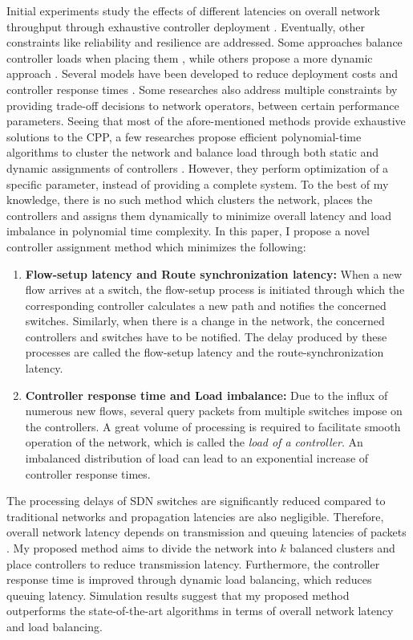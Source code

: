 \documentclass[preprint,12pt]{elsarticle}
\begin{document}
	Initial experiments study the effects of different latencies on overall network throughput through exhaustive controller deployment \cite{cpp2012heller}. Eventually, other constraints like reliability \cite{hu2013reliability} and resilience \cite{zhang2011resilience} are addressed. Some approaches balance controller loads when placing them \cite{yao2014capacitated}, while others propose a more dynamic approach \cite{yao2015controller}. Several models have been developed to reduce deployment costs \cite{sallahi2015optimal} and controller response times \cite{wang2016dynamic}. Some researches also address multiple constraints by providing trade-off decisions to network operators, between certain performance parameters. Seeing that most of the afore-mentioned methods provide exhaustive solutions to the CPP, a few researches propose efficient polynomial-time algorithms to cluster the network \cite{dbcp2017} and balance load through both static \cite{dbcp2017} and dynamic assignments of controllers \cite{filali2018sdn}. However, they perform optimization of a specific parameter, instead of providing a complete system. To the best of my knowledge, there is no such method which clusters the network, places the controllers and assigns them dynamically to minimize overall latency and load imbalance in polynomial time complexity. In this paper, I propose a novel controller assignment method which minimizes the following:
	\begin{enumerate}
		\item \textbf{Flow-setup latency and Route synchronization latency:} When a new flow arrives at a switch, the flow-setup process is initiated through which the corresponding controller calculates a new path and notifies the concerned switches. Similarly, when there is a change in the network, the concerned controllers and switches have to be notified. The delay produced by these processes are called the flow-setup latency and the route-synchronization latency.
		\item \textbf{Controller response time and Load imbalance:} Due to the influx of numerous new flows, several query packets from multiple switches impose on the controllers. A great volume of processing is required to facilitate smooth operation of the network, which is called the \textit{load of a controller}. An imbalanced distribution of load can lead to an exponential increase of controller response times.
	\end{enumerate}
	The processing delays of SDN switches are significantly reduced compared to traditional networks and propagation latencies are also negligible. Therefore, overall network latency depends on transmission and queuing latencies of packets \cite{forouzan2006data}. My proposed method aims to divide the network into $k$ balanced clusters and place controllers to reduce transmission latency. Furthermore, the controller response time is improved through dynamic load balancing, which reduces queuing latency. Simulation results suggest that my proposed method outperforms the state-of-the-art algorithms in terms of overall network latency and load balancing.
	
\end{document}
